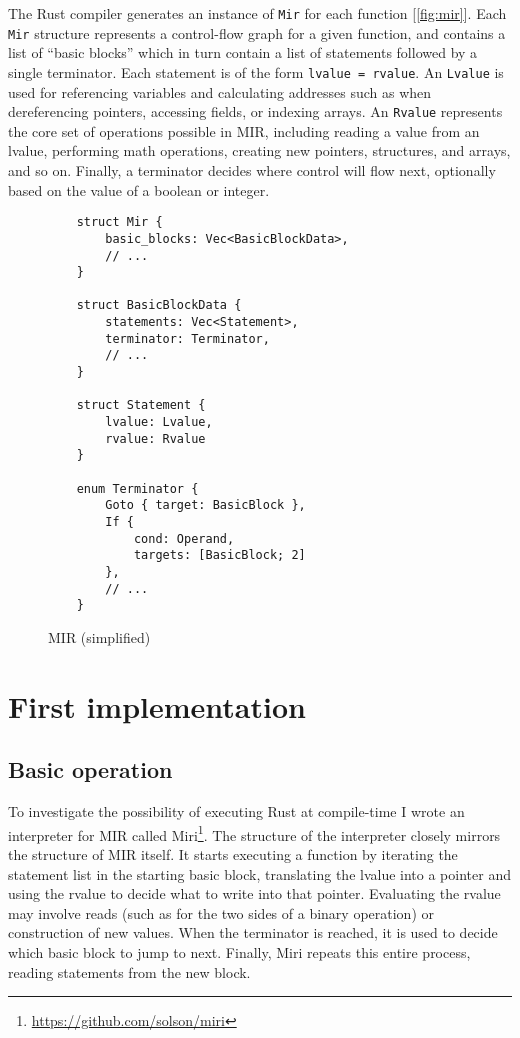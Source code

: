 \documentclass[twocolumn]{article}
\newcommand{\rust}[1]{\texttt{#1}}
\begin{document}
The Rust compiler generates an instance of \rust{Mir} for each function [\autoref{fig:mir}]. Each
\rust{Mir} structure represents a control-flow graph for a given function, and contains a list of
``basic blocks'' which in turn contain a list of statements followed by a single terminator. Each
statement is of the form \rust{lvalue = rvalue}. An \rust{Lvalue} is used for referencing variables
and calculating addresses such as when dereferencing pointers, accessing fields, or indexing arrays.
An \rust{Rvalue} represents the core set of operations possible in MIR, including reading a value
from an lvalue, performing math operations, creating new pointers, structures, and arrays, and so
on. Finally, a terminator decides where control will flow next, optionally based on the value of a
boolean or integer.

\begin{figure}[ht]
  \begin{verbatim}
    struct Mir {
        basic_blocks: Vec<BasicBlockData>,
        // ...
    }

    struct BasicBlockData {
        statements: Vec<Statement>,
        terminator: Terminator,
        // ...
    }

    struct Statement {
        lvalue: Lvalue,
        rvalue: Rvalue
    }

    enum Terminator {
        Goto { target: BasicBlock },
        If {
            cond: Operand,
            targets: [BasicBlock; 2]
        },
        // ...
    }
  \end{verbatim}
  \caption{MIR (simplified)}
  \label{fig:mir}
\end{figure}


\section{First implementation}

\subsection{Basic operation}

To investigate the possibility of executing Rust at compile-time I wrote an interpreter for MIR
called Miri\footnote{\url{https://github.com/solson/miri}}. The structure of the interpreter closely
mirrors the structure of MIR itself. It starts executing a function by iterating the statement list
in the starting basic block, translating the lvalue into a pointer and using the rvalue to decide
what to write into that pointer. Evaluating the rvalue may involve reads (such as for the two sides
of a binary operation) or construction of new values. When the terminator is reached, it is used to
decide which basic block to jump to next. Finally, Miri repeats this entire process, reading
statements from the new block.
\end{document}
